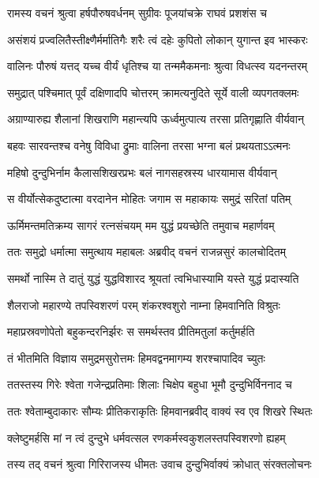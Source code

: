 
\twolineshloka
{रामस्य वचनं श्रुत्वा हर्षपौरुषवर्धनम्}
{सुग्रीवः पूजयांचक्रे राघवं प्रशशंस च} %

\twolineshloka
{असंशयं प्रज्वलितैस्तीक्ष्णैर्मर्मातिगैः शरैः}
{त्वं दहेः कुपितो लोकान् युगान्त इव भास्करः} %

\twolineshloka
{वालिनः पौरुषं यत्तद् यच्च वीर्यं धृतिश्च या}
{तन्ममैकमनाः श्रुत्वा विधत्स्व यदनन्तरम्} %

\twolineshloka
{समुद्रात् पश्चिमात् पूर्वं दक्षिणादपि चोत्तरम्}
{क्रामत्यनुदिते सूर्ये वाली व्यपगतक्लमः} %

\twolineshloka
{अग्राण्यारुह्य शैलानां शिखराणि महान्त्यपि}
{ऊर्ध्वमुत्पात्य तरसा प्रतिगृह्णाति वीर्यवान्} %

\twolineshloka
{बहवः सारवन्तश्च वनेषु विविधा द्रुमाः}
{वालिना तरसा भग्ना बलं प्रथयताऽऽत्मनः} %

\twolineshloka
{महिषो दुन्दुभिर्नाम कैलासशिखरप्रभः}
{बलं नागसहस्रस्य धारयामास वीर्यवान्} %

\twolineshloka
{स वीर्योत्सेकदुष्टात्मा वरदानेन मोहितः}
{जगाम स महाकायः समुद्रं सरितां पतिम्} %

\twolineshloka
{ऊर्मिमन्तमतिक्रम्य सागरं रत्नसंचयम्}
{मम युद्धं प्रयच्छेति तमुवाच महार्णवम्} %

\twolineshloka
{ततः समुद्रो धर्मात्मा समुत्थाय महाबलः}
{अब्रवीद् वचनं राजन्नसुरं कालचोदितम्} %

\twolineshloka
{समर्थो नास्मि ते दातुं युद्धं युद्धविशारद}
{श्रूयतां त्वभिधास्यामि यस्ते युद्धं प्रदास्यति} %

\twolineshloka
{शैलराजो महारण्ये तपस्विशरणं परम्}
{शंकरश्वशुरो नाम्ना हिमवानिति विश्रुतः} %

\twolineshloka
{महाप्रस्रवणोपेतो बहुकन्दरनिर्झरः}
{स समर्थस्तव प्रीतिमतुलां कर्तुमर्हति} %

\twolineshloka
{तं भीतमिति विज्ञाय समुद्रमसुरोत्तमः}
{हिमवद्वनमागम्य शरश्चापादिव च्युतः} %

\twolineshloka
{ततस्तस्य गिरेः श्वेता गजेन्द्रप्रतिमाः शिलाः}
{चिक्षेप बहुधा भूमौ दुन्दुभिर्विननाद च} %

\twolineshloka
{ततः श्वेताम्बुदाकारः सौम्यः प्रीतिकराकृतिः}
{हिमवानब्रवीद् वाक्यं स्व एव शिखरे स्थितः} %

\twolineshloka
{क्लेष्टुमर्हसि मां न त्वं दुन्दुभे धर्मवत्सल}
{रणकर्मस्वकुशलस्तपस्विशरणो ह्यहम्} %

\twolineshloka
{तस्य तद् वचनं श्रुत्वा गिरिराजस्य धीमतः}
{उवाच दुन्दुभिर्वाक्यं क्रोधात् संरक्तलोचनः} %

